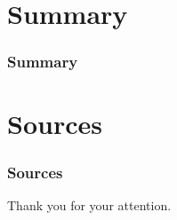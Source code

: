 \section{Summary}

\begin{frame}
	\frametitle{Summary}
\end{frame}

\section{Sources}

\begin{frame}[allowframebreaks]
	\frametitle{Sources}
	\nocite{*}
%	
%	
	\printbibliography
\end{frame}


\begin{frame}[plain]
	\begin{center}
		\Large{{Thank you for your attention.}}
	\end{center}
\end{frame}

\frame[plain]


